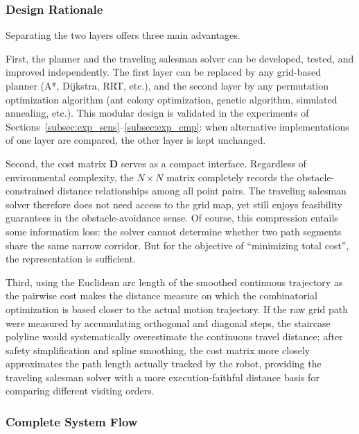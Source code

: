 \subsubsection{Design Rationale}

Separating the two layers offers three main advantages.

First, the planner and the traveling salesman solver can be developed, tested, and improved independently. The first layer can be replaced by any grid-based planner (A*, Dijkstra, RRT, etc.), and the second layer by any permutation optimization algorithm (ant colony optimization, genetic algorithm, simulated annealing, etc.). This modular design is validated in the experiments of Sections~\textcolor{blue}{\ref{subsec:exp_sens}}--\textcolor{blue}{\ref{subsec:exp_cmp}}: when alternative implementations of one layer are compared, the other layer is kept unchanged.

Second, the cost matrix $\mathbf{D}$ serves as a compact interface. Regardless of environmental complexity, the $N \times N$ matrix completely records the obstacle-constrained distance relationships among all point pairs. The traveling salesman solver therefore does not need access to the grid map, yet still enjoys feasibility guarantees in the obstacle-avoidance sense. Of course, this compression entails some information loss: the solver cannot determine whether two path segments share the same narrow corridor. But for the objective of ``minimizing total cost'', the representation is sufficient.

Third, using the Euclidean arc length of the smoothed continuous trajectory as the pairwise cost makes the distance measure on which the combinatorial optimization is based closer to the actual motion trajectory. If the raw grid path were measured by accumulating orthogonal and diagonal steps, the staircase polyline would systematically overestimate the continuous travel distance; after safety simplification and spline smoothing, the cost matrix more closely approximates the path length actually tracked by the robot, providing the traveling salesman solver with a more execution-faithful distance basis for comparing different visiting orders.

\subsubsection{Complete System Flow}

